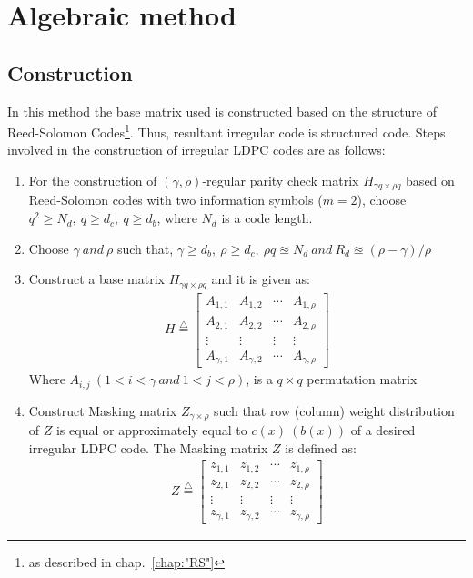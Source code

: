 \section{Algebraic method}
\subsection{Construction}
In this method the base matrix used is constructed based on the structure of Reed-Solomon Codes\footnote{as described in chap.~\ref{chap:"RS"}}. Thus, resultant irregular code is structured code. Steps involved in the construction of irregular LDPC codes are as follows:
\begin{enumerate}
 \item For the construction of $(\gamma,\rho)$-regular parity check matrix $H_{\gamma q \times \rho q}$ based on Reed-Solomon codes with two information symbols ($m=2$), choose $q^2 \geq N_d,~ q \geq d_c, ~ q \geq d_b$, where $N_d$ is a code length.
 \item Choose $\gamma ~ and ~ \rho$ such that, $\gamma \geq d_b, ~ \rho \geq d_c, ~ \rho q \approxeq N_d ~ and ~ R_d\approxeq (\rho-\gamma)/\rho$
 \item Construct a base matrix $H_{\gamma q \times \rho q}$ and it is given as:
\begin{align}
 H \overset{\triangle}{=}  \begin{bmatrix}
A_{1,1} & A_{1,2} & \cdots & A_{1,\rho}\\
A_{2,1} & A_{2,2} & \cdots & A_{2,\rho}\\
\vdots & \vdots & \vdots & \vdots\\
A_{\gamma,1} & A_{\gamma,2} & \cdots & A_{\gamma,\rho} \end{bmatrix} \nonumber
\end{align}
Where $A_{i,j} ~ (1<i<\gamma ~ and ~ 1<j<\rho)$, is a $q \times q$ permutation matrix
 \item Construct Masking matrix $Z_{\gamma \times \rho}$ such that row (column) weight distribution of $Z$ is equal or approximately equal to $c(x) ~ (b(x))$ of a desired irregular LDPC code. The Masking matrix $Z$ is defined as:
\begin{align}
  Z \overset{\triangle}{=}  \begin{bmatrix}
z_{1,1} & z_{1,2} & \cdots & z_{1,\rho}\\
z_{2,1} & z_{2,2} & \cdots & z_{2,\rho}\\
\vdots & \vdots & \vdots & \vdots\\
z_{\gamma,1} & z_{\gamma,2} & \cdots & z_{\gamma,\rho} \end{bmatrix} \nonumber

\end{align}
\end{enumerate}
